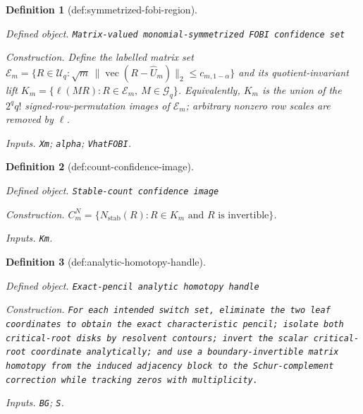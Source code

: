 \documentclass{article}
\newtheorem{definition}{Definition}
\begin{document}
\begin{definition}[def:symmetrized-fobi-region]\label{def:symmetrized-fobi-region}
\par\smallskip\noindent\emph{Defined object.} \texttt{Matrix-\allowbreak{}valued monomial-\allowbreak{}symmetrized FOBI confidence set}
\par\smallskip\noindent\emph{Construction.} Define the labelled matrix set \(\mathcal E_m=\{R\in\mathcal U_q:\sqrt m\,\|\operatorname{vec}(R-\widehat U_m)\|_2\leq c_{m,1-\alpha}\}\) and its quotient-invariant lift \(K_m=\{\ell(MR):R\in\mathcal E_m,\ M\in\mathcal G_q\}\). Equivalently, \(K_m\) is the union of the \(2^q q!\) signed-row-permutation images of \(\mathcal E_m\); arbitrary nonzero row scales are removed by \(\ell\).
\par\smallskip\noindent\emph{Inputs.} \texttt{Xm}; \texttt{alpha}; \texttt{VhatFOBI}.
\end{definition}

\begin{definition}[def:count-confidence-image]\label{def:count-confidence-image}
\par\smallskip\noindent\emph{Defined object.} \texttt{Stable-\allowbreak{}count confidence image}
\par\smallskip\noindent\emph{Construction.} \(C_m^N=\{N_{\mathrm{stab}}(R):R\in K_m\text{ and }R\text{ is invertible}\}\).
\par\smallskip\noindent\emph{Inputs.} \texttt{Km}.
\end{definition}

\begin{definition}[def:analytic-homotopy-handle]\label{def:analytic-homotopy-handle}
\par\smallskip\noindent\emph{Defined object.} \texttt{Exact-\allowbreak{}pencil analytic homotopy handle}
\par\smallskip\noindent\emph{Construction.} \texttt{For each intended switch set,\allowbreak{} eliminate the two leaf coordinates to obtain the exact characteristic pencil;\allowbreak{} isolate both critical-\allowbreak{}root disks by resolvent contours;\allowbreak{} invert the scalar critical-\allowbreak{}root coordinate analytically;\allowbreak{} and use a boundary-\allowbreak{}invertible matrix homotopy from the induced adjacency block to the Schur-\allowbreak{}complement correction while tracking zeros with multiplicity.}
\par\smallskip\noindent\emph{Inputs.} \texttt{BG}; \texttt{S}.
\end{definition}
\end{document}
